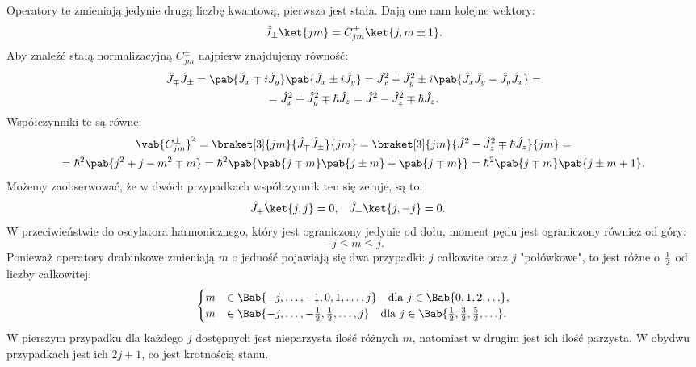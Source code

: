 Operatory te zmieniają jedynie drugą liczbę kwantową, pierwsza jest stała. Dają one nam kolejne wektory:
\begin{equation}
	\hat{J}_{\pm} \ket{jm} = C_{jm}^{\pm} \ket{j,m \pm 1}.
\end{equation}
Aby znaleźć stałą normalizacyjną \(C_{jm}^{\pm}\) najpierw znajdujemy równość:
\begin{multline}
	\hat{J}_{\mp} \hat{J}_{\pm} =
	\pab{\hat{J}_x \mp i\hat{J}_y}\pab{\hat{J}_x \pm i\hat{J}_y} =
	\hat{J}_x^2 + \hat{J}_y^2 \pm i\pab{\hat{J}_x \hat{J}_y - \hat{J}_y \hat{J}_x} = \\ =
	\hat{J}_x^2 + \hat{J}_y^2 \mp \hbar \hat{J}_z =
	\hat{J}^2 - \hat{J}_z^2 \mp \hbar \hat{J}_z.
\end{multline}
Współczynniki te są równe:
\begin{multline}
	\vab{C_{jm}^{\pm}}^2 =
	\braket[3]{jm}{\hat{J}_{\mp} \hat{J}_{\pm}}{jm} =
	\braket[3]{jm}{\hat{J}^2 - \hat{J}_z^2 \mp \hbar \hat{J}_z}{jm} = \\ =
	\hbar^2\pab{j^2 + j - m^2 \mp m} =
	\hbar^2\pab{\pab{j \mp m}\pab{j \pm m} + \pab{j \mp m}} =
	\hbar^2\pab{j \mp m}\pab{j \pm m + 1}.
\end{multline}
Możemy zaobserwować, że w dwóch przypadkach współczynnik ten się zeruje, są to:
\begin{align}
	\hat{J}_{+} \ket{j,j} &= 0, &
	\hat{J}_{-} \ket{j,-j} &= 0.
\end{align}
W przeciwieństwie do oscylatora harmonicznego, który jest ograniczony jedynie od dołu, moment pędu jest ograniczony również od góry:
\begin{equation}
	-j \leq m \leq j.
\end{equation}
Ponieważ operatory drabinkowe zmieniają \(m\) o jedność pojawiają się dwa przypadki: \(j\) całkowite oraz \(j\) "połówkowe", to jest różne o \(\frac{1}{2}\) od liczby całkowitej:
\begin{equation}
\begin{cases}
	m &\in\Bab{-j, \ldots, -1, 0, 1, \ldots, j} \quad \text{dla } j \in\Bab{0, 1, 2, \ldots}, \\
	m &\in\Bab{-j, \ldots, -\inv{2}, \inv{2}, \ldots, j} \quad \text{dla } j \in\Bab{\frac{1}{2}, \frac{3}{2}, \frac{5}{2}, \ldots}.
\end{cases}
\end{equation}
W pierszym przypadku dla każdego \(j\) dostępnych jest nieparzysta ilość różnych \(m\), natomiast w drugim jest ich ilość parzysta. W obydwu przypadkach jest ich \(2j + 1\), co jest krotnością stanu.

